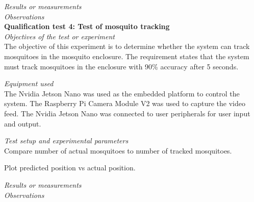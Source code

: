 \textit{Results or measurements}\\

\textit{Observations}\\

\textbf{Qualification test 4: Test of mosquito tracking}\\

\textit{Objectives of the test or experiment}\\
The objective of this experiment is to determine whether the system can track mosquitoes in the mosquito enclosure. The requirement states that the system must track mosquitoes in the enclosure with 90\% accuracy after 5 seconds.

\textit{Equipment used}\\
The Nvidia Jetson Nano was used as the embedded platform to control the system. The Raspberry Pi Camera Module V2 was used to capture the video feed. The Nvidia Jetson Nano was connected to user peripherals for user input and output.

\textit{Test setup and experimental parameters}\\
Compare number of actual mosquitoes to number of tracked mosquitoes.


Plot predicted position vs actual position.


\textit{Results or measurements}\\

\textit{Observations}\\

\newpage



